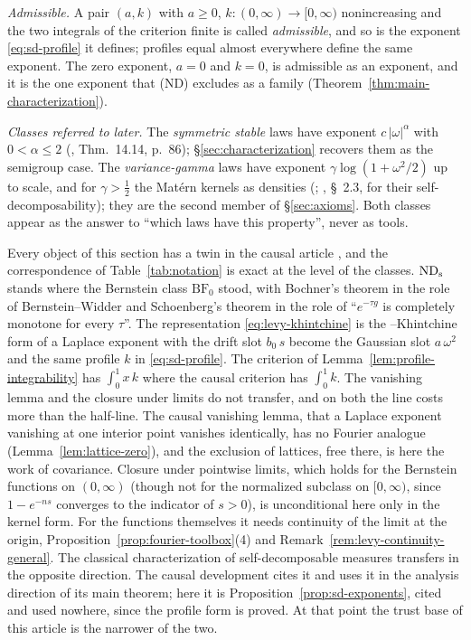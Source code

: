 \emph{Admissible.} A pair $(a,k)$ with $a \ge 0$, $k : (0,\infty) \to [0,\infty)$ nonincreasing
and the two integrals of the criterion finite is called \emph{admissible}, and so is the
exponent \ref{eq:sd-profile} it defines; profiles equal almost everywhere define the same
exponent. The zero exponent, $a = 0$ and $k = 0$, is admissible as an exponent, and it is
the one exponent that (ND) excludes as a family (Theorem~\ref{thm:main-characterization}).

\emph{Classes referred to later.} The \emph{symmetric stable} laws have exponent
$c\,|\omega|^\alpha$ with $0 < \alpha \le 2$ (, Thm.~14.14, p.~86);
\S\ref{sec:characterization} recovers them as the semigroup case. The \emph{variance-gamma}
laws have exponent $\gamma\log(1 + \omega^2/2)$ up to scale, and for $\gamma > \tfrac12$
the Mat\'ern kernels as densities (; , \S~2.3, for their
self-decomposability); they are the second member of \S\ref{sec:axioms}. Both classes
appear as the answer to ``which laws have this property'', never as tools.

\begin{remark}\label{rem:causal-relation-preliminaries}
Every object of this section has a twin in the causal article
, and the correspondence of Table~\ref{tab:notation} is
exact at the level of the classes. $\mathrm{ND}_{\mathrm{s}}$ stands where the Bernstein class $\mathrm{BF}_0$
stood, with Bochner's theorem in the role of Bernstein--Widder and Schoenberg's theorem in
the role of ``$e^{-\tau g}$ is completely monotone for every $\tau$''. The representation
\ref{eq:levy-khintchine} is the \Levy--Khintchine form of a Laplace exponent with the
drift slot $b_0\,s$ become the Gaussian slot $a\,\omega^2$ and the same profile $k$ in
\ref{eq:sd-profile}. The criterion of Lemma~\ref{lem:profile-integrability} has
$\int_0^1 x\,k$ where the causal criterion has $\int_0^1 k$. The vanishing lemma and the
closure under limits do not transfer, and on both the line costs more than the half-line.
The causal vanishing lemma, that a Laplace exponent vanishing at one interior point
vanishes identically, has no Fourier analogue (Lemma~\ref{lem:lattice-zero}), and the
exclusion of lattices, free there, is here the work of covariance. Closure under pointwise
limits, which holds for the Bernstein functions on $(0,\infty)$ (though not for the
normalized subclass on $[0,\infty)$, since $1 - e^{-ns}$ converges to the indicator of
$s > 0$), is unconditional here only in the kernel form. For the functions themselves it needs continuity of the limit at the origin,
Proposition~\ref{prop:fourier-toolbox}(4) and Remark~\ref{rem:levy-continuity-general}.
The classical characterization of self-decomposable \Levy{} measures transfers in the
opposite direction. The causal development cites it and uses it in the analysis direction
of its main theorem; here it is Proposition~\ref{prop:sd-exponents}, cited and used
nowhere, since the profile form is proved. At that point the trust base of this article is
the narrower of the two.
\end{remark}
